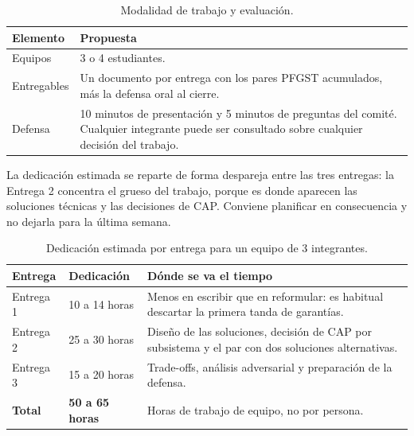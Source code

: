 \documentclass[variant=guia,cover=institutional,mode=screen]{ua-engineering-v6-article}
\begin{document}
    \begin{table}[H]
        \centering
        \begin{tabular}{p{}p{}}
            \toprule
            \textbf{Elemento} & \textbf{Propuesta} \\
            \midrule
            Equipos & 3 o 4 estudiantes. \\
            Entregables & Un documento por entrega con los pares PFGST acumulados, más la defensa oral al cierre. \\
            Defensa & 10 minutos de presentación y 5 minutos de preguntas del comité.
            Cualquier integrante puede ser consultado sobre cualquier decisión del trabajo. \\
            \bottomrule
        \end{tabular}
        \caption{Modalidad de trabajo y evaluación.}\label{tab:modalidad}
    \end{table}

    La dedicación estimada se reparte de forma despareja entre las tres entregas: la Entrega 2 concentra el grueso del trabajo, porque es donde aparecen las soluciones técnicas y las decisiones de CAP. Conviene planificar en consecuencia y no dejarla para la última semana.

    \begin{table}[H]
        \centering
        \begin{tabular}{p{}p{}p{}}
            \toprule
            \textbf{Entrega} & \textbf{Dedicación} & \textbf{Dónde se va el tiempo} \\
            \midrule
            Entrega 1 & 10 a 14 horas & Menos en escribir que en reformular: es habitual descartar la primera tanda de garantías. \\
            Entrega 2 & 25 a 30 horas & Diseño de las soluciones, decisión de CAP por subsistema y el par con dos soluciones alternativas. \\
            Entrega 3 & 15 a 20 horas & Trade-offs, análisis adversarial y preparación de la defensa. \\
            \midrule
            \textbf{Total} & \textbf{50 a 65 horas} & Horas de trabajo de equipo, no por persona. \\
            \bottomrule
        \end{tabular}
        \caption{Dedicación estimada por entrega para un equipo de 3 integrantes.}\label{tab:dedicacion}
    \end{table}
\end{document}
